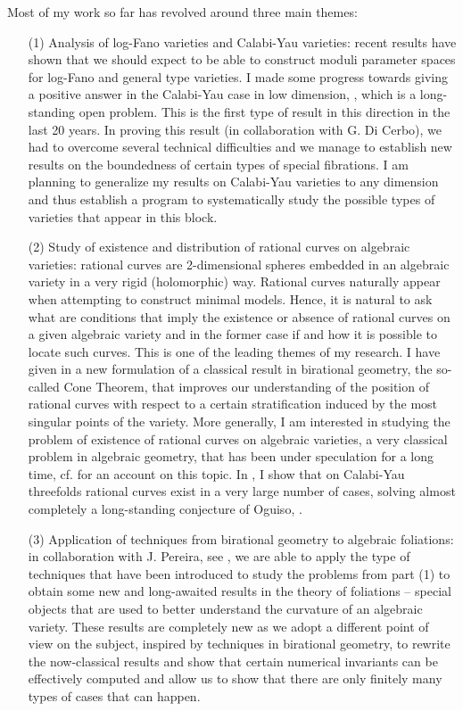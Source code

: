 \documentclass[10.9pt]{res} %
\numberwithin{equation}{section}
\theoremstyle{definition}
\begin{document}
\begin{resume}
Most of my work so far has revolved around three main themes: 
\begin{enumerate}
\item[(1)] Analysis of log-Fano varieties and Calabi-Yau varieties: recent results \cite{hmx.gen.type, BAB} have shown
that we should expect to be able to construct moduli parameter spaces for log-Fano and general type varieties.
I made some progress towards giving a positive answer in the Calabi-Yau case
in low dimension, \cite{mio.lcy}, which is a long-standing open problem.
This is the first type of result in this direction in the last 20 years.
In proving this result (in collaboration with G. Di Cerbo), we had to overcome several technical difficulties 
and we manage to establish new results on the boundedness of certain types of special fibrations.\newline
I am planning to generalize my results on Calabi-Yau varieties to any dimension
and thus establish a program to systematically study the possible types of
varieties that appear in this block.
\item[(2)] Study of existence and distribution of rational curves on algebraic varieties: 
rational curves are 2-dimensional spheres embedded in an algebraic variety in a very rigid (holomorphic) way.
Rational curves naturally appear when attempting to construct minimal models. 
Hence, it is natural to ask what are conditions that imply the existence or absence of rational curves on a given algebraic variety
and in the former case if and how it is possible to locate such curves. This is one of the leading themes of my research.
I have given in \cite{mio.hyperb} a new formulation of a classical result in birational geometry, the so-called Cone Theorem, that improves
our understanding of the position of rational curves with respect to a certain stratification induced by the most singular points of the variety.\newline
More generally, I am interested in studying the problem of existence of rational curves on algebraic varieties,
a very classical problem in algebraic geometry, that has been under speculation for a long time, cf. \cite{dem2012} for an account on this topic.
In \cite{mio.cy}, I show that on Calabi-Yau threefolds rational curves exist in a very large number of cases, 
solving almost completely a long-standing conjecture of Oguiso, \cite{Ogui93}.
\item[(3)] Application of techniques from birational geometry to algebraic foliations:
in collaboration with J. Pereira, see \cite{mio.fol.2}, we are able to apply the type of techniques that have been introduced to study the
problems from part (1) to obtain some new and long-awaited results in the theory of foliations -- special objects that are used to 
better understand the curvature of an algebraic variety. These results are completely new as we adopt
a different point of view on the subject, inspired by techniques in birational geometry, to rewrite the
now-classical results and show that certain numerical invariants can be effectively computed
and allow us to show that there are only finitely many types of cases that can happen.
\end{enumerate}



\end{resume}
\end{document}
